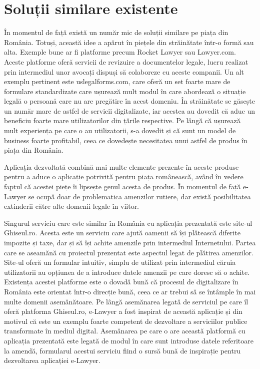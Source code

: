 \documentclass[12pt,a4paper]{report}
\theoremstyle{definition}
\theoremstyle{remark}
\begin{document}
\section{Soluții similare existente}
\vspace{20pt}
În momentul de față există un număr mic de soluții similare pe piața din România. Totuși, această idee a apărut în piețele din străinătate într-o formă sau alta. Exemple bune ar fi platforme precum Rocket Lawyer sau Lawyer.com. Aceste platforme oferă servicii de revizuire a documentelor legale, lucru realizat prin intermediul unor avocați dispuși să colaboreze cu aceste companii. Un alt exemplu pertinent este uslegalforms.com, care oferă un set foarte mare de formulare standardizate care ușurează mult modul în care abordează o situație legală o persoană care nu are pregătire în acest domeniu. În străinătate se găsește un număr mare de astfel de servicii digitalizate, iar acestea au dovedit că aduc un beneficiu foarte mare utilizatorilor din țările respective. Pe lângă că ușurează mult experiența pe care o au utilizatorii, s-a dovedit și că sunt un model de business foarte profitabil, ceea ce dovedește necesitatea unui astfel de produs în piața din România.

Aplicația dezvoltată combină mai multe elemente prezente în aceste produse pentru a aduce o aplicație potrivită pentru piața românească, având în vedere faptul că acestei piețe îi lipsește genul acesta de produs. În momentul de față e-Lawyer se ocupă doar de problematica amenzilor rutiere, dar există posibilitatea extinderii către alte domenii legale în viitor. 

Singurul serviciu care este similar în România cu aplicația prezentată este site-ul Ghiseul.ro. Acesta este un serviciu care ajută oamenii să își plătească diferite impozite și taxe, dar și să își achite amenzile prin intermediul Internetului. Partea care se aseamănă cu proiectul prezentat este aspectul legat de plătirea amenzilor. Site-ul oferă un formular intuitiv, simplu de utilizat prin intermediul căruia utilizatorii au opțiunea de a introduce datele amenzii pe care doresc să o achite. Existența acestei platforme este o dovadă bună că procesul de digitalizare în România este orientat într-o direcție bună, ceea ce ar trebui să se întâmple în mai multe domenii asemănătoare. Pe lângă asemănarea legată de serviciul pe care îl oferă platforma Ghiseul.ro, e-Lawyer a fost inspirat de această aplicație și din motivul că este un exemplu foarte competent de dezvoltare a serviciilor publice transformate în mediul digital. Asemănarea pe care o are această platformă cu aplicația prezentată este legată de modul în care sunt introduse datele referitoare la amendă, formularul acestui serviciu fiind o sursă bună de inspirație pentru dezvoltarea aplicației e-Lawyer.
\end{document}
